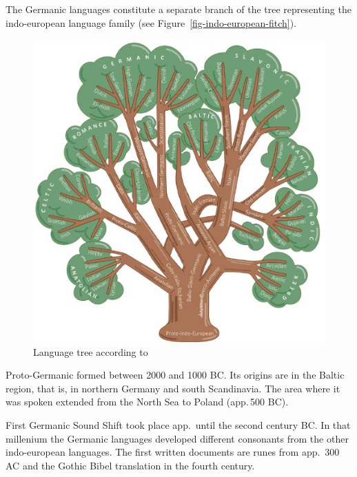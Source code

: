 The Germanic languages constitute a separate branch of the tree representing the indo-european
language family (see Figure~\vref{fig-indo-european-fitch}). 
\begin{figure}
\includegraphics[width=\textwidth]{Pictures/indoeuropaeisch}
\caption{\label{fig-indo-european-fitch}Language tree according to \citet[p.\,665]{Fitch2007a-u}}
\end{figure}
Proto-Germanic formed between 2000 and
1000 BC. Its origins are in the Baltic region, that is, in northern Germany and south
Scandinavia. The area where it was spoken extended from the North Sea to Poland (app.\,500 BC).


First Germanic Sound Shift took place app.\ until the second century BC. In that millenium the
Germanic languages developed different consonants from the other indo-european languages. The first
written documents are runes from app.\ 300 AC and the Gothic Bibel translation in the fourth century.

